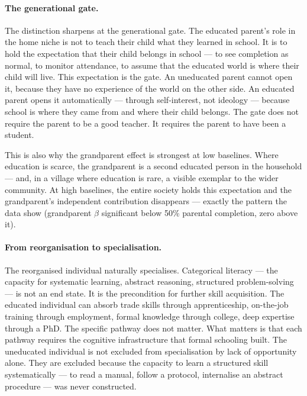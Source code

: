 \documentclass[12pt,letterpaper]{article}
\begin{document}
\paragraph{The generational gate.}

The distinction sharpens at the generational gate. The educated parent's
role in the home niche is not to teach their child what they learned in
school. It is to hold the expectation that their child belongs in
school --- to see completion as normal, to monitor attendance, to
assume that the educated world is where their child will live. This
expectation is the gate. An uneducated parent cannot open it, because
they have no experience of the
world on the other side. An educated parent opens it automatically ---
through self-interest, not ideology --- because school is where they came
from and where their child belongs. The gate does not require the parent
to be a good teacher. It requires the parent to have been a student.

This is also why the grandparent effect is strongest at low baselines.
Where education is scarce, the grandparent is a second educated person
in the household --- and, in a village where education is rare, a visible
exemplar to the wider community. At high baselines, the entire society
holds this expectation and the grandparent's independent contribution
disappears --- exactly the pattern the data show (grandparent $\beta$
significant below 50\% parental completion, zero above it).

\paragraph{From reorganisation to specialisation.}

The reorganised individual naturally specialises. Categorical literacy
--- the capacity for systematic learning, abstract reasoning, structured
problem-solving --- is not an end state. It is the precondition for
further skill acquisition. The educated individual can absorb trade
skills through apprenticeship, on-the-job training through employment,
formal knowledge through college, deep expertise through a PhD. The
specific pathway does not matter. What matters is that each pathway
requires the cognitive infrastructure that formal schooling built. The
uneducated individual is not excluded from specialisation by lack of
opportunity alone. They are excluded because the capacity to learn a
structured skill systematically --- to read a manual, follow a protocol,
internalise an abstract procedure --- was never constructed.
\end{document}
